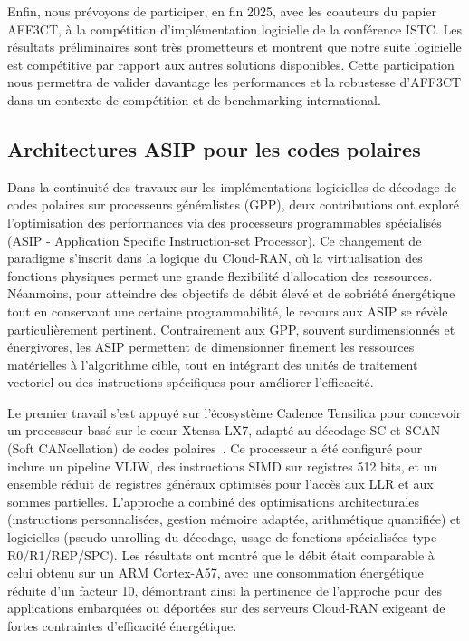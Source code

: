 \documentclass[11pt]{report}
\begin{document}
Enfin, nous prévoyons de participer, en fin 2025, avec les coauteurs du papier AFF3CT, à la compétition d'implémentation logicielle de la conférence ISTC. Les résultats préliminaires sont très prometteurs et montrent que notre suite logicielle est compétitive par rapport aux autres solutions disponibles. Cette participation nous permettra de valider davantage les performances et la robustesse d'AFF3CT dans un contexte de compétition et de benchmarking international.


\subsection{Architectures ASIP pour les codes polaires}
Dans la continuité des travaux sur les implémentations logicielles de décodage de codes polaires sur processeurs généralistes (GPP), deux contributions ont exploré l'optimisation des performances via des processeurs programmables spécialisés (ASIP - Application Specific Instruction-set Processor). Ce changement de paradigme s'inscrit dans la logique du Cloud-RAN, où la virtualisation des fonctions physiques permet une grande flexibilité d'allocation des ressources. Néanmoins, pour atteindre des objectifs de débit élevé et de sobriété énergétique tout en conservant une certaine programmabilité, le recours aux ASIP se révèle particulièrement pertinent. Contrairement aux GPP, souvent surdimensionnés et énergivores, les ASIP permettent de dimensionner finement les ressources matérielles à l'algorithme cible, tout en intégrant des unités de traitement vectoriel ou des instructions spécifiques pour améliorer l'efficacité.

Le premier travail s'est appuyé sur l'écosystème Cadence Tensilica pour concevoir un processeur basé sur le cœur Xtensa LX7, adapté au décodage SC et SCAN (Soft CANcellation) de codes polaires~\cite{leonardon:hal-03291077}. Ce processeur a été configuré pour inclure un pipeline VLIW, des instructions SIMD sur registres 512 bits, et un ensemble réduit de registres généraux optimisés pour l'accès aux LLR et aux sommes partielles. L'approche a combiné des optimisations architecturales (instructions personnalisées, gestion mémoire adaptée, arithmétique quantifiée) et logicielles (pseudo-unrolling du décodage, usage de fonctions spécialisées type R0/R1/REP/SPC). Les résultats ont montré que le débit était comparable à celui obtenu sur un ARM Cortex-A57, avec une consommation énergétique réduite d'un facteur 10, démontrant ainsi la pertinence de l'approche pour des applications embarquées ou déportées sur des serveurs Cloud-RAN exigeant de fortes contraintes d'efficacité énergétique.
\end{document}

